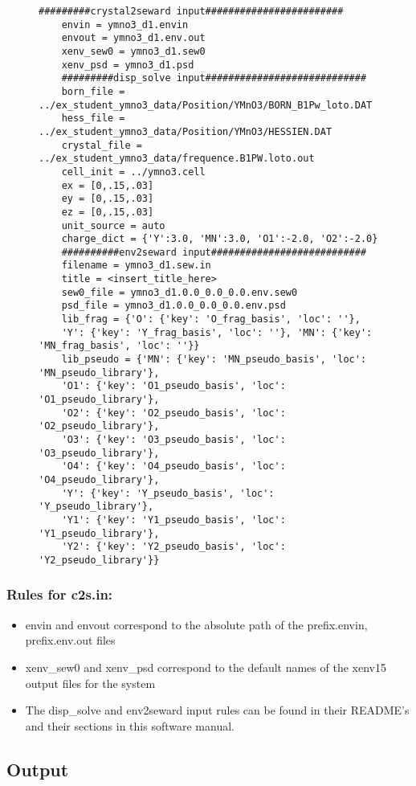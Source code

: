 \begin{figure}
	\centering
	\begin{BVerbatim}[fontsize=\small]
	#########crystal2seward input########################
	envin = ymno3_d1.envin
	envout = ymno3_d1.env.out
	xenv_sew0 = ymno3_d1.sew0
	xenv_psd = ymno3_d1.psd
	#########disp_solve input############################
	born_file = ../ex_student_ymno3_data/Position/YMnO3/BORN_B1Pw_loto.DAT
	hess_file = ../ex_student_ymno3_data/Position/YMnO3/HESSIEN.DAT
	crystal_file = ../ex_student_ymno3_data/frequence.B1PW.loto.out
	cell_init = ../ymno3.cell
	ex = [0,.15,.03]
	ey = [0,.15,.03]
	ez = [0,.15,.03]
	unit_source = auto
	charge_dict = {'Y':3.0, 'MN':3.0, 'O1':-2.0, 'O2':-2.0}
	##########env2seward input###########################
	filename = ymno3_d1.sew.in
	title = <insert_title_here>
	sew0_file = ymno3_d1.0.0_0.0_0.0.env.sew0
	psd_file = ymno3_d1.0.0_0.0_0.0.env.psd
	lib_frag = {'O': {'key': 'O_frag_basis', 'loc': ''},
	'Y': {'key': 'Y_frag_basis', 'loc': ''}, 'MN': {'key': 'MN_frag_basis', 'loc': ''}}
	lib_pseudo = {'MN': {'key': 'MN_pseudo_basis', 'loc': 'MN_pseudo_library'},
	'O1': {'key': 'O1_pseudo_basis', 'loc': 'O1_pseudo_library'},
	'O2': {'key': 'O2_pseudo_basis', 'loc': 'O2_pseudo_library'},
	'O3': {'key': 'O3_pseudo_basis', 'loc': 'O3_pseudo_library'},
	'O4': {'key': 'O4_pseudo_basis', 'loc': 'O4_pseudo_library'},
	'Y': {'key': 'Y_pseudo_basis', 'loc': 'Y_pseudo_library'},
	'Y1': {'key': 'Y1_pseudo_basis', 'loc': 'Y1_pseudo_library'},
	'Y2': {'key': 'Y2_pseudo_basis', 'loc': 'Y2_pseudo_library'}}
	\end{BVerbatim}
	\caption{}
\end{figure}

\subsubsection{Rules for c2s.in:}

\begin{itemize}
	\item envin and envout correspond to the absolute path of the prefix.envin, prefix.env.out files
	\item xenv\_sew0 and xenv\_psd correspond to the default names of the xenv15 output files for the system
	\item The disp\_solve and env2seward input rules can be found in their README's and their sections in this software manual.
\end{itemize}

\subsection{Output}

